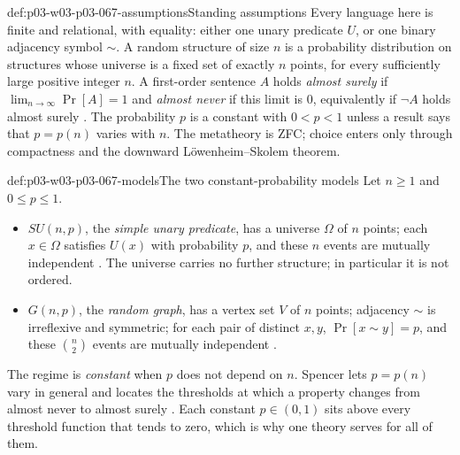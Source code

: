 \begin{hbconvention}{def:p03-w03-p03-067-assumptions}{Standing assumptions}
Every language here is finite and relational, with equality: either one
unary predicate \(U\), or one binary adjacency symbol \(\sim\).  A random
structure of size \(n\) is a probability distribution on structures whose
universe is a fixed set of exactly \(n\) points, for every sufficiently large
positive integer \(n\).  A first-order sentence \(A\) holds \emph{almost
surely} if \(\lim_{n\to\infty}\Pr[A]=1\) and \emph{almost never} if this limit
is \(0\), equivalently if \(\neg A\) holds almost surely
\cite[p.~2]{Spencer2007LogicRandomStructuresAuthor}.  The probability \(p\) is
a constant with \(0<p<1\) unless a result says that \(p=p(n)\) varies with
\(n\).  The metatheory is ZFC; choice enters only through compactness and the
downward L\"owenheim--Skolem theorem.
\end{hbconvention}

\begin{hbdefinition}{def:p03-w03-p03-067-models}{The two constant-probability models}
Let \(n\geq1\) and \(0\leq p\leq1\).
\begin{itemize}
\item \(SU(n,p)\), the \emph{simple unary predicate}, has a universe
  \(\Omega\) of \(n\) points; each \(x\in\Omega\) satisfies \(U(x)\) with
  probability \(p\), and these \(n\) events are mutually independent
  \cite[p.~1]{Spencer2007LogicRandomStructuresAuthor}.  The universe carries
  no further structure; in particular it is not ordered.
\item \(G(n,p)\), the \emph{random graph}, has a vertex set \(V\) of \(n\)
  points; adjacency \(\sim\) is irreflexive and symmetric; for each pair of
  distinct \(x,y\), \(\Pr[x\sim y]=p\), and these \(\binom n2\) events are
  mutually independent \cite[p.~4]{Spencer2007LogicRandomStructuresAuthor}.
\end{itemize}
\end{hbdefinition}

The regime is \emph{constant} when \(p\) does not depend on \(n\).  Spencer
lets \(p=p(n)\) vary in general and locates the thresholds at which a property
changes from almost never to almost surely
\cite[pp.~2, 4]{Spencer2007LogicRandomStructuresAuthor}.  Each constant
\(p\in(0,1)\) sits above every threshold function that tends to zero, which is
why one theory serves for all of them.

